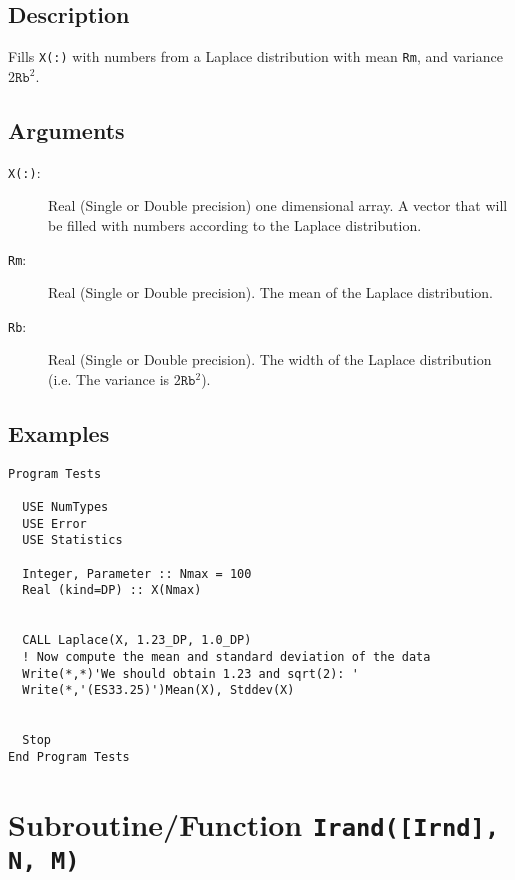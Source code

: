 \subsection{Description}

Fills \texttt{X(:)} with numbers from a Laplace distribution with mean
\texttt{Rm}, and variance $2\mathtt{Rb}^2$. 

\subsection{Arguments}

\begin{description}
\item[\texttt{X(:)}:] Real (Single or Double precision) one
  dimensional array. A vector that will be filled with numbers
  according to the Laplace distribution.
\item[\texttt{Rm}:] Real (Single or Double precision). The
  mean of the Laplace distribution.
\item[\texttt{Rb}:] Real (Single or Double precision). The
  width of the Laplace distribution (i.e. The variance is
  $2\mathtt{Rb}^2$).
\end{description}

\subsection{Examples}

\begin{lstlisting}[emph=Laplace,
                   emphstyle=\color{blue},
                   frame=trBL,
                   caption=Obtaining numbers with a Laplace distribution.,
                   label=laplace]
Program Tests

  USE NumTypes
  USE Error
  USE Statistics

  Integer, Parameter :: Nmax = 100
  Real (kind=DP) :: X(Nmax)


  CALL Laplace(X, 1.23_DP, 1.0_DP)
  ! Now compute the mean and standard deviation of the data
  Write(*,*)'We should obtain 1.23 and sqrt(2): '
  Write(*,'(ES33.25)')Mean(X), Stddev(X)


  Stop
End Program Tests
\end{lstlisting}

\section{Subroutine/Function \texttt{Irand([Irnd], N, M)}}

